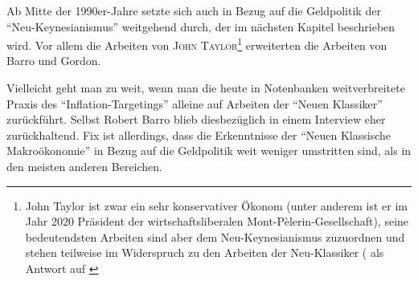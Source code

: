 Ab Mitte der 1990er-Jahre setzte sich auch in Bezug auf die Geldpolitik der "`Neu-Keynesianismus"' weitgehend durch, der im nächsten Kapitel beschrieben wird. Vor allem die Arbeiten von \textsc{John Taylor}\footnote{John Taylor ist zwar ein sehr konservativer Ökonom (unter anderem ist er im Jahr 2020 Präsident der wirtschaftsliberalen Mont-Pèlerin-Gesellschaft), seine bedeutendsten Arbeiten sind aber dem Neu-Keynesianismus zuzuordnen und stehen teilweise im Widerspruch zu den Arbeiten der Neu-Klassiker (\textcite{Taylor1977} als Antwort auf \textcite{Sargent1975} } erweiterten die Arbeiten von Barro und Gordon.

Vielleicht geht man zu weit, wenn man die heute in Notenbanken weitverbreitete Praxis des "`Inflation-Targetings"' alleine auf Arbeiten der "`Neuen Klassiker"' zurückführt. Selbst Robert Barro blieb diesbezüglich in einem Interview \parencite{Barro2005} eher zurückhaltend. Fix ist allerdings, dass die Erkenntnisse der "`Neuen Klassische Makroökonomie"' in Bezug auf die Geldpolitik weit weniger umstritten sind, als in den meisten anderen Bereichen. 


